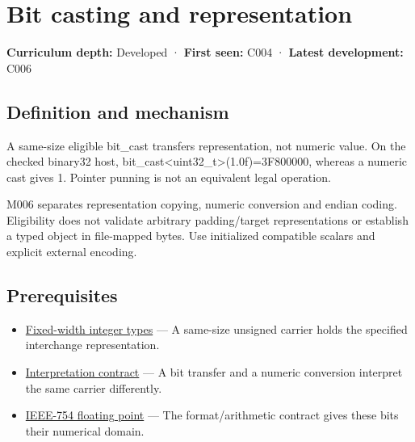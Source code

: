 \hypertarget{appendix-34ee45f161c1}{}\label{referencestart:appendix-34ee45f161c1}
\section{Bit casting and representation}\label{appendix-34ee45f161c1-bit-casting-and-representation}

\hypertarget{appendix-34ee45f161c1-bit-casting-and-representation}{}

\textbf{Curriculum depth:} Developed · \textbf{First seen:} C004 · \textbf{Latest development:} C006

\begin{allmightroledefinition}

\subsection{Definition and mechanism}\label{appendix-34ee45f161c1-definition-and-mechanism}

\hypertarget{appendix-34ee45f161c1-definition-and-mechanism}{}

A same-size eligible bit\_cast transfers representation, not numeric value. On the checked binary32 host, bit\_cast\textless uint32\_t\textgreater{}(1.0f)=3F800000, whereas a numeric cast gives 1. Pointer punning is not an equivalent legal operation.

\end{allmightroledefinition}

M006 separates representation copying, numeric conversion and endian coding. Eligibility does not validate arbitrary padding/target representations or establish a typed object in file-mapped bytes. Use initialized compatible scalars and explicit external encoding.

\subsection{Prerequisites}\label{appendix-34ee45f161c1-prerequisites}

\hypertarget{appendix-34ee45f161c1-prerequisites}{}

\begin{itemize}
\tightlist
\item
  \hyperref[appendix-cc04044b5782]{Fixed-width integer types} --- A same-size unsigned carrier holds the specified interchange representation.
\item
  \hyperref[appendix-f414bd4ed05c]{Interpretation contract} --- A bit transfer and a numeric conversion interpret the same carrier differently.
\item
  \hyperref[appendix-343615f49ddf]{IEEE-754 floating point} --- The format/arithmetic contract gives these bits their numerical domain.
\end{itemize}

